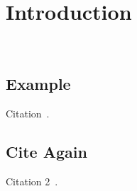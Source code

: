 
\chapter{Introduction}~\label{chp:intro}

\vspace{-4.3ex} %
\section{Example}

Citation~\cite{lecun1989handwritten}.


\lipsum[1-3]


\section{Cite Again}

Citation 2~\cite{lecun1989handwritten,lecun1989backpropagation}.
